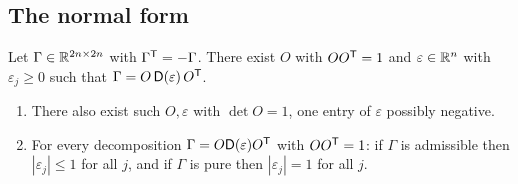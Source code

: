 \subsection{The normal form}
\label{sec:normalform}

\begin{theorem}\label{thm:normal-form}
Let $\Gamma\in\mathbb R^{2n\times2n}$ with $\Gamma^{\mathsf T}=-\Gamma$. There exist $O$ with $OO^{\mathsf T}=1$ and
$\varepsilon\in\mathbb R^n$ with $\varepsilon_j\geq0$ such that $\Gamma=O\,\mathsf D(\varepsilon)\,O^{\mathsf T}$.
\begin{enumerate}
\item[(a)] There also exist such $O,\varepsilon$ with $\det O=1$, one entry of $\varepsilon$
possibly negative.
\item[(b)] For every decomposition $\Gamma=O\mathsf D(\varepsilon)O^{\mathsf T}$ with $OO^{\mathsf T}=1$: if
$\Gamma$ is admissible then $|\varepsilon_j|\leq1$ for all $j$, and if $\Gamma$ is pure
then $|\varepsilon_j|=1$ for all $j$.
\end{enumerate}
\end{theorem}
